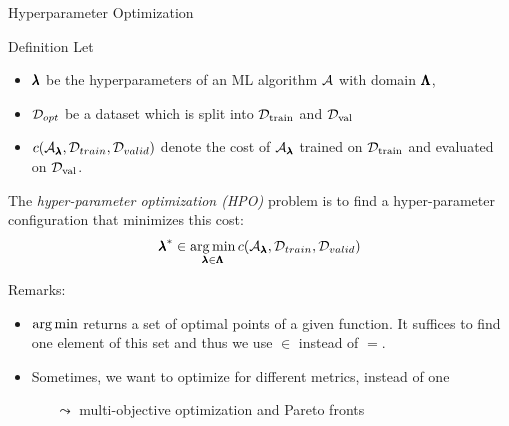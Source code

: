 \begin{frame}[c]{Hyperparameter Optimization}

\begin{block}{Definition}
	Let 
	\begin{itemize}
		\item $\pmb{\lambda}$ be the hyperparameters of an ML algorithm $\mathcal{A}$ with domain $\pmb{\Lambda}$,
		\pause
		\item $\mathcal{D}_{opt}$ be a dataset which is split into $\mathcal{D}_{\text{train}}$ and $\mathcal{D}_{\text{val}}$ 
		\pause
		\item $c(\mathcal{A}_{\pmb{\lambda}}, \mathcal{D}_{train}, \mathcal{D}_{valid})$ denote the cost of $\mathcal{A}_{\pmb{\lambda}}$ trained on $\mathcal{D}_{\text{train}}$ and evaluated on $\mathcal{D}_{\text{val}}$.
	\end{itemize}
	\pause
	The \emph{hyper-parameter optimization (HPO)} problem is to find a hyper-parameter configuration that minimizes this cost:
	\begin{equation}
	{\pmb{\lambda}}^* \in \operatorname*{arg\,min}_{\pmb{\lambda} \in \pmb{\Lambda}} c(\mathcal{A}_{\pmb{\lambda}}, \mathcal{D}_{train}, \mathcal{D}_{valid}) \nonumber  
	\end{equation}
\end{block}

\pause
Remarks: 

\begin{itemize}
	\item $\operatorname*{arg\,min}$ returns a set of optimal points of a given function. It suffices to find one element of this set and thus we use $\in$ instead of $=$.
	\pause
	\item Sometimes, we want to optimize for different metrics, instead of one
	\begin{itemize}
		\item[$\leadsto$] multi-objective optimization and Pareto fronts
	\end{itemize}
\end{itemize}

\end{frame}
